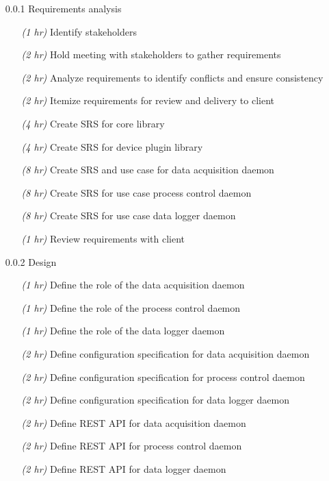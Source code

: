 \documentclass[11pt]{article}
\begin{document}
      \begin{itemize}
        \item[0.0.1] Requirements analysis
          \begin{itemize}
            \item[\emph{(1 hr)}] Identify stakeholders
            \item[\emph{(2 hr)}] Hold meeting with stakeholders to gather requirements
            \item[\emph{(2 hr)}] Analyze requirements to identify conflicts and ensure consistency
            \item[\emph{(2 hr)}] Itemize requirements for review and delivery to client
            \item[\emph{(4 hr)}] Create SRS for core library
            \item[\emph{(4 hr)}] Create SRS for device plugin library
            \item[\emph{(8 hr)}] Create SRS and use case for data acquisition daemon
            \item[\emph{(8 hr)}] Create SRS for use case process control daemon
            \item[\emph{(8 hr)}] Create SRS for use case data logger daemon
            \item[\emph{(1 hr)}] Review requirements with client
          \end{itemize}
        \item[0.0.2] Design
          \begin{itemize}
            \item[\emph{(1 hr)}] Define the role of the data acquisition daemon
            \item[\emph{(1 hr)}] Define the role of the process control daemon
            \item[\emph{(1 hr)}] Define the role of the data logger daemon
            \item[\emph{(2 hr)}] Define configuration specification for data acquisition daemon
            \item[\emph{(2 hr)}] Define configuration specification for process control daemon
            \item[\emph{(2 hr)}] Define configuration specification for data logger daemon
            \item[\emph{(2 hr)}] Define REST API for data acquisition daemon
            \item[\emph{(2 hr)}] Define REST API for process control daemon
            \item[\emph{(2 hr)}] Define REST API for data logger daemon

\end{itemize}
\end{itemize}
\end{document}

